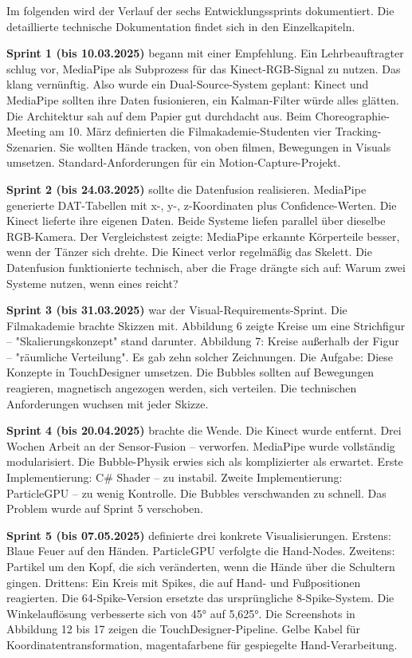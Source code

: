 Im folgenden wird der Verlauf der sechs Entwicklungssprints dokumentiert. Die detaillierte technische Dokumentation findet sich in den Einzelkapiteln.

\textbf{Sprint 1 (bis 10.03.2025)} begann mit einer Empfehlung. Ein Lehrbeauftragter schlug vor, MediaPipe als Subprozess für das Kinect-RGB-Signal zu nutzen. Das klang vernünftig. Also wurde ein Dual-Source-System geplant: Kinect und MediaPipe sollten ihre Daten fusionieren, ein Kalman-Filter würde alles glätten. Die Architektur sah auf dem Papier gut durchdacht aus. Beim Choreographie-Meeting am 10. März definierten die Filmakademie-Studenten vier Tracking-Szenarien. Sie wollten Hände tracken, von oben filmen, Bewegungen in Visuals umsetzen. Standard-Anforderungen für ein Motion-Capture-Projekt.

\textbf{Sprint 2 (bis 24.03.2025) }sollte die Datenfusion realisieren. MediaPipe generierte DAT-Tabellen mit x-, y-, z-Koordinaten plus Confidence-Werten. Die Kinect lieferte ihre eigenen Daten. Beide Systeme liefen parallel über dieselbe RGB-Kamera. Der Vergleichstest zeigte: MediaPipe erkannte Körperteile besser, wenn der Tänzer sich drehte. Die Kinect verlor regelmäßig das Skelett. Die Datenfusion funktionierte technisch, aber die Frage drängte sich auf: Warum zwei Systeme nutzen, wenn eines reicht?

\textbf{Sprint 3 (bis 31.03.2025)} war der Visual-Requirements-Sprint. Die Filmakademie brachte Skizzen mit. Abbildung 6 zeigte Kreise um eine Strichfigur – "Skalierungskonzept" stand darunter. Abbildung 7: Kreise außerhalb der Figur – "räumliche Verteilung". Es gab zehn solcher Zeichnungen. Die Aufgabe: Diese Konzepte in TouchDesigner umsetzen. Die Bubbles sollten auf Bewegungen reagieren, magnetisch angezogen werden, sich verteilen. Die technischen Anforderungen wuchsen mit jeder Skizze.

\textbf{Sprint 4 (bis 20.04.2025) }brachte die Wende. Die Kinect wurde entfernt. Drei Wochen Arbeit an der Sensor-Fusion – verworfen. MediaPipe wurde vollständig modularisiert. Die Bubble-Physik erwies sich als komplizierter als erwartet. Erste Implementierung: C\# Shader – zu instabil. Zweite Implementierung: ParticleGPU – zu wenig Kontrolle. Die Bubbles verschwanden zu schnell. Das Problem wurde auf Sprint 5 verschoben.

\textbf{Sprint 5 (bis 07.05.2025)} definierte drei konkrete Visualisierungen. Erstens: Blaue Feuer auf den Händen. ParticleGPU verfolgte die Hand-Nodes. Zweitens: Partikel um den Kopf, die sich veränderten, wenn die Hände über die Schultern gingen. Drittens: Ein Kreis mit Spikes, die auf Hand- und Fußpositionen reagierten. Die 64-Spike-Version ersetzte das ursprüngliche 8-Spike-System. Die Winkelauflösung verbesserte sich von 45° auf 5,625°. Die Screenshots in Abbildung 12 bis 17 zeigen die TouchDesigner-Pipeline. Gelbe Kabel für Koordinatentransformation, magentafarbene für gespiegelte Hand-Verarbeitung.


